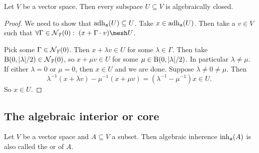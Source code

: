\begin{lemma}
Let $V$ be a vector space. Then every subspace $U\subseteq V$ is algebraically closed.
\end{lemma}
\begin{proof}
We need to show that $\operatorname{adh}_\mathfrak{a}(U)\subseteq U$. Take $x\in \operatorname{adh}_\mathfrak{a}(U)$. Then take a $v\in V$ such that $\forall \Gamma\in\neighbourhood_\F(0):\; (x+\Gamma\cdot v)\mesh U$.

Pick some $\Gamma\in\operatorname{\mathcal{N}}_{\mathbb{F}}(0)$. Then $x+\lambda v\in U$ for some $\lambda\in \Gamma$. Then take $\operatorname{B}(0,|\lambda|/2)\in \operatorname{\mathcal{N}}_{\mathbb{F}}(0)$, so $x+\mu v\in U$ for some $\mu\in \operatorname{B}(0,|\lambda|/2)$. In particular $\lambda \neq \mu$. If either $\lambda =0$ or $\mu = 0$, then $x\in U$ and we are done. Suppose $\lambda\neq 0 \neq \mu$. Then
\[ \lambda^{-1}(x+\lambda v) - \mu^{-1}(x+\mu v) = (\lambda^{-1} - \mu^{-1})x \in U. \]
So $x\in U$.
\end{proof}

\subsection{The algebraic interior or core}
\begin{definition}
Let $V$ be a vector space and $A\subseteq V$ a subset. Then algebraic inherence $\operatorname{inh}_\mathfrak{a}(A)$ is also called the  or  of $A$.
\end{definition}

